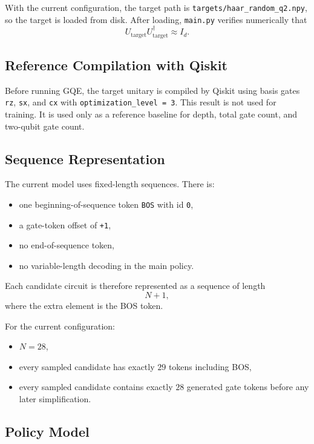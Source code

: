 \documentclass[11pt]{article}
\begin{document}
With the current configuration, the target path is \texttt{targets/haar\_random\_q2.npy}, so the target is loaded from disk. After loading, \texttt{main.py} verifies numerically that
\[
U_{\mathrm{target}} U_{\mathrm{target}}^\dagger \approx I_d.
\]

\subsection{Reference Compilation with Qiskit}

Before running GQE, the target unitary is compiled by Qiskit using basis gates \texttt{rz}, \texttt{sx}, and \texttt{cx} with \texttt{optimization\_level = 3}. This result is not used for training. It is used only as a reference baseline for depth, total gate count, and two-qubit gate count.

\subsection{Sequence Representation}

The current model uses fixed-length sequences. There is:

\begin{itemize}[leftmargin=*]
\item one beginning-of-sequence token \texttt{BOS} with id \texttt{0},
\item a gate-token offset of \texttt{+1},
\item no end-of-sequence token,
\item no variable-length decoding in the main policy.
\end{itemize}

Each candidate circuit is therefore represented as a sequence of length
\[
N + 1,
\]
where the extra element is the BOS token.

For the current configuration:

\begin{itemize}[leftmargin=*]
\item $N = 28$,
\item every sampled candidate has exactly $29$ tokens including BOS,
\item every sampled candidate contains exactly $28$ generated gate tokens before any later simplification.
\end{itemize}

\subsection{Policy Model}
\end{document}
